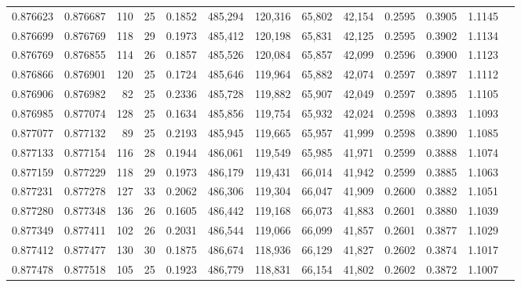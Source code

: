 \begin{tabular}{rrrrrrrrrrrrr}
0.876623 & 0.876687 &   110 &  25 &                                     0.1852 & 485,294 & 120,316 &  65,802 &  42,154 & 0.2595 & 0.3905 & 1.1145 \\
0.876699 & 0.876769 &   118 &  29 &                                     0.1973 & 485,412 & 120,198 &  65,831 &  42,125 & 0.2595 & 0.3902 & 1.1134 \\
0.876769 & 0.876855 &   114 &  26 &                                     0.1857 & 485,526 & 120,084 &  65,857 &  42,099 & 0.2596 & 0.3900 & 1.1123 \\
0.876866 & 0.876901 &   120 &  25 &                                     0.1724 & 485,646 & 119,964 &  65,882 &  42,074 & 0.2597 & 0.3897 & 1.1112 \\
0.876906 & 0.876982 &    82 &  25 &                                     0.2336 & 485,728 & 119,882 &  65,907 &  42,049 & 0.2597 & 0.3895 & 1.1105 \\
0.876985 & 0.877074 &   128 &  25 &                                     0.1634 & 485,856 & 119,754 &  65,932 &  42,024 & 0.2598 & 0.3893 & 1.1093 \\
0.877077 & 0.877132 &    89 &  25 &                                     0.2193 & 485,945 & 119,665 &  65,957 &  41,999 & 0.2598 & 0.3890 & 1.1085 \\
0.877133 & 0.877154 &   116 &  28 &                                     0.1944 & 486,061 & 119,549 &  65,985 &  41,971 & 0.2599 & 0.3888 & 1.1074 \\
0.877159 & 0.877229 &   118 &  29 &                                     0.1973 & 486,179 & 119,431 &  66,014 &  41,942 & 0.2599 & 0.3885 & 1.1063 \\
0.877231 & 0.877278 &   127 &  33 &                                     0.2062 & 486,306 & 119,304 &  66,047 &  41,909 & 0.2600 & 0.3882 & 1.1051 \\
0.877280 & 0.877348 &   136 &  26 &                                     0.1605 & 486,442 & 119,168 &  66,073 &  41,883 & 0.2601 & 0.3880 & 1.1039 \\
0.877349 & 0.877411 &   102 &  26 &                                     0.2031 & 486,544 & 119,066 &  66,099 &  41,857 & 0.2601 & 0.3877 & 1.1029 \\
0.877412 & 0.877477 &   130 &  30 &                                     0.1875 & 486,674 & 118,936 &  66,129 &  41,827 & 0.2602 & 0.3874 & 1.1017 \\
0.877478 & 0.877518 &   105 &  25 &                                     0.1923 & 486,779 & 118,831 &  66,154 &  41,802 & 0.2602 & 0.3872 & 1.1007 \\

\end{tabular}
